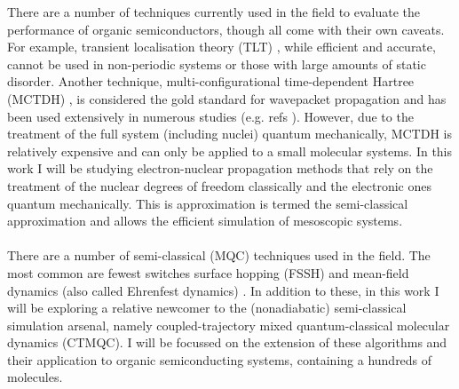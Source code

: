 There are a number of  techniques currently used in the field to evaluate the performance of organic semiconductors, though all come with their own caveats. For example, transient localisation theory (TLT) \cite{Nematiaram2019, PhysRevB.83.081202, Fratini_2016}, while efficient and accurate, cannot be used in non-periodic systems or those with large amounts of static disorder. Another technique, multi-configurational time-dependent Hartree (MCTDH) \cite{MCTDH, cattarius_all_2001}, is considered the gold standard for wavepacket propagation and has been used extensively in numerous studies (e.g. refs \cite{MANTHE19937,doi:10.1063/1.463332,doi:10.1063/1.469292}). However, due to the treatment of the full system  (including nuclei) quantum mechanically, MCTDH is relatively expensive and can only be applied to a small molecular systems. In this work I will be studying electron-nuclear propagation methods that rely on the treatment of the nuclear degrees of freedom classically and the electronic ones quantum mechanically. This is approximation is termed the semi-classical approximation and allows the efficient simulation of mesoscopic systems.
\\\\
There are a number of semi-classical (MQC)\add{, } techniques used in the field. The most common are fewest switches surface hopping (FSSH) \cite{FSSH_orig} and mean-field dynamics (also called Ehrenfest dynamics) \cite{Ehrenfest1927}. In addition to these, in this work I will be exploring a relative newcomer to the (nonadiabatic) semi-classical simulation arsenal, namely coupled-trajectory mixed quantum-classical molecular dynamics (CTMQC). I will be focussed on the extension of these algorithms and their application to organic semiconducting systems, containing a hundreds of molecules.


